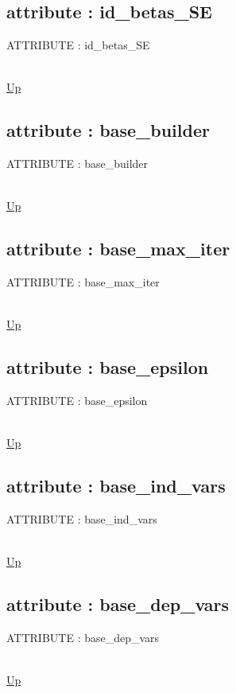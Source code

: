 \subsection*{attribute : id\_betas\_SE}
\hypertarget{ecldoc:logisticregression.constants.id_betas_se}{ATTRIBUTE : id\_betas\_SE} \\
\hyperlink{ecldoc:LogisticRegression.Constants}{Up} \\
\par
\subsection*{attribute : base\_builder}
\hypertarget{ecldoc:logisticregression.constants.base_builder}{ATTRIBUTE : base\_builder} \\
\hyperlink{ecldoc:LogisticRegression.Constants}{Up} \\
\par
\subsection*{attribute : base\_max\_iter}
\hypertarget{ecldoc:logisticregression.constants.base_max_iter}{ATTRIBUTE : base\_max\_iter} \\
\hyperlink{ecldoc:LogisticRegression.Constants}{Up} \\
\par
\subsection*{attribute : base\_epsilon}
\hypertarget{ecldoc:logisticregression.constants.base_epsilon}{ATTRIBUTE : base\_epsilon} \\
\hyperlink{ecldoc:LogisticRegression.Constants}{Up} \\
\par
\subsection*{attribute : base\_ind\_vars}
\hypertarget{ecldoc:logisticregression.constants.base_ind_vars}{ATTRIBUTE : base\_ind\_vars} \\
\hyperlink{ecldoc:LogisticRegression.Constants}{Up} \\
\par
\subsection*{attribute : base\_dep\_vars}
\hypertarget{ecldoc:logisticregression.constants.base_dep_vars}{ATTRIBUTE : base\_dep\_vars} \\
\hyperlink{ecldoc:LogisticRegression.Constants}{Up} \\
\par
